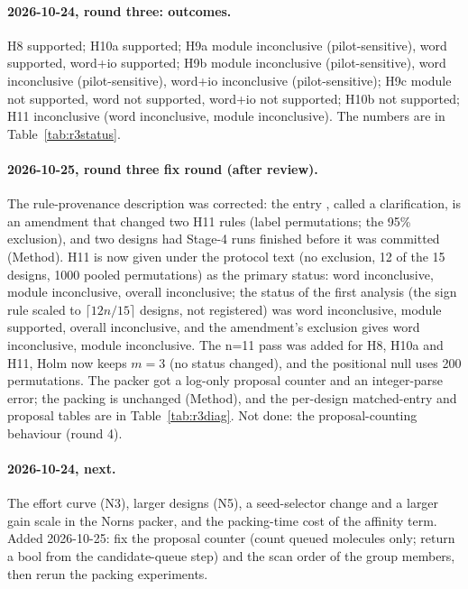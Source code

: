 \paragraph{2026-10-24, round three: outcomes.} H8 supported; H10a supported; H9a module inconclusive (pilot-sensitive), word supported, word+io supported; H9b module inconclusive (pilot-sensitive), word inconclusive (pilot-sensitive), word+io inconclusive (pilot-sensitive); H9c module not supported, word not supported, word+io not supported; H10b not supported; H11 inconclusive (word inconclusive, module inconclusive). The numbers are in Table~\ref{tab:r3status}.

\paragraph{2026-10-25, round three fix round (after review).} The rule-provenance description was corrected: the entry
, called a clarification, is an amendment that changed two H11 rules (label permutations; the 95\% exclusion), and two
designs had Stage-4 runs finished before it was committed (Method). H11 is now given under the protocol text (no exclusion,
12 of the 15 designs, 1000 pooled permutations) as the primary status: word inconclusive, module inconclusive, overall inconclusive; the status of the first analysis (the sign rule
scaled to $\lceil 12n/15\rceil$ designs, not registered) was word inconclusive, module supported, overall inconclusive, and the amendment's exclusion gives word inconclusive, module inconclusive. The n=11 pass was added for
H8, H10a and H11, Holm now keeps $m=3$ (no status changed), and the positional null uses 200 permutations. The packer got a log-only proposal
counter and an integer-parse error; the packing is unchanged (Method), and the per-design matched-entry and proposal tables
are in Table~\ref{tab:r3diag}. Not done: the proposal-counting behaviour (round 4).

\paragraph{2026-10-24, next.} The effort curve (N3), larger designs (N5), a seed-selector change and a larger gain scale in the Norns packer, and the
packing-time cost of the affinity term. Added 2026-10-25: fix the proposal counter (count queued molecules only; return a bool from the
candidate-queue step) and the scan order of the group members, then rerun the packing experiments.

